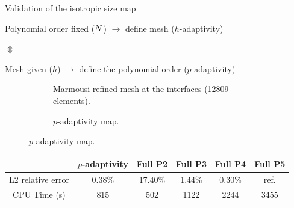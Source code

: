 \begin{frame}[noframenumbering]{Validation of the isotropic size map}
  \begin{block}{}
    Polynomial order fixed (${N}$) $\longrightarrow$ define mesh ($h$-adaptivity)
  \end{block}

  $\Updownarrow$

    \begin{block}{}
    Mesh given ($h$) $\longrightarrow$ define the polynomial order ($p$-adaptivity)
    \end{block}

      \vspace{-0.4cm}
\setlength{\modelwidth}{6.5cm}
\begin{figure}[!htbp]
  \renewcommand{\modelfile}{image/iso22_mesh}
     \begin{subfigure}[!htbp]{0.5\textwidth}
        \vspace{0.4cm}
        \hspace{-0.5cm}
         \centering
         
         \caption{Marmousi refined mesh at the interfaces (12809 elements).}
         \label{marmousi_mesh_padapt}
     \end{subfigure}
     \hspace{-1cm}
     \renewcommand{\modelfile}{image/iso22_order}
     \renewcommand{\cmapmin}{2}
     \renewcommand{\cmapmax}{4}
     \begin{subfigure}[!htbp]{0.5\textwidth}
        \vspace{-0.3cm}
         \centering
         
         \vspace{-0.9cm}
         \caption{$p$-adaptivity map.}
         \label{marmousi_order_padapt}
     \end{subfigure}

\end{figure}

\vspace{-0.5cm}
\begin{table}[!htbp]
  \small
    \centering
    \begin{tabular}{|c|c|c|c|c|c|}
    \hline
         & $p$-adaptivity & Full P2 & Full P3 & Full P4 & Full P5 \\ \hline
        L2 relative error & \cellcolor{green!30}0.38\%  & \cellcolor{red!30} 17.40\% & \cellcolor{red!30} 1.44\% & \cellcolor{green!30} 0.30\% &  ref. \\ \hline
        CPU Time (s) & \cellcolor{green!30} 815 & 502 & 1122 & \cellcolor{red!30}2244 & 3455 \\ \hline
    \end{tabular}
\end{table}
\end{frame}



